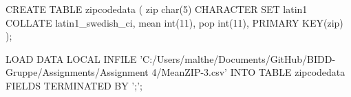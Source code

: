 CREATE TABLE zipcodedata (
	zip char(5) CHARACTER SET latin1 COLLATE latin1_swedish_ci,
	mean int(11),
	pop int(11),
	PRIMARY KEY(zip)
);

LOAD DATA LOCAL INFILE 'C:/Users/malthe/Documents/GitHub/BIDD-Gruppe/Assignments/Assignment 4/MeanZIP-3.csv'
INTO TABLE zipcodedata
FIELDS TERMINATED BY ';';
